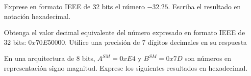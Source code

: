 \documentclass[addpoints]{exam}
\begin{document}
\begin{questions}



\question[2] Exprese en formato IEEE de 32 bits el número
$-32.25$. Escriba el resultado en notación hexadecimal. %
\droptotalpoints


\question[2] Obtenga el valor decimal equivalente del número expresado en
formato  IEEE de 32 bits: $0x70E50000$. Utilice una precisión de 7
dígitos decimales en su respuesta%
\droptotalpoints

\question En una arquitectura de 8 bits, $A^{SM}=0xE4$ y
  $B^{SM}=0x7D$ son números en representación signo magnitud. Exprese
  los siguientes resultados en hexadecimal.
\end{questions}
\end{document}
